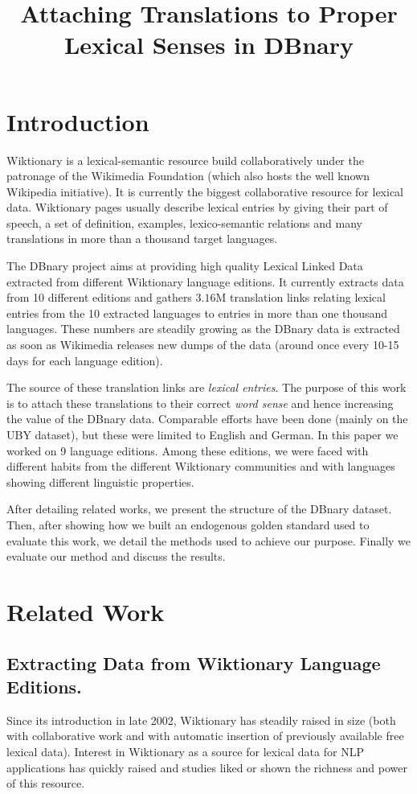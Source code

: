\documentclass[10pt, a4paper]{article}
\title{Attaching Translations to Proper Lexical Senses in DBnary}
\begin{document}
\maketitleabstract

\section{Introduction}

 Wiktionary is a lexical-semantic resource build collaboratively under the patronage of the Wikimedia Foundation (which also hosts the well known Wikipedia initiative). It is currently the biggest collaborative resource for lexical data. Wiktionary pages usually describe lexical entries by giving their part of speech, a set of definition, examples, lexico-semantic relations and many translations in more than a thousand target languages.

The DBnary project \cite{serasset:dbnary-swj} aims at providing high quality Lexical Linked Data extracted from different Wiktionary language editions. It currently extracts data from 10 different editions and gathers $3.16$M translation links relating lexical entries from the 10 extracted languages to entries in more than one thousand languages. These numbers are steadily growing as the DBnary data is extracted as soon as Wikimedia releases new dumps of the data (around once every 10-15 days for each language edition).

The source of these translation links are \emph{lexical entries}. The purpose of this work is to attach these translations to their correct \emph{word sense} and hence increasing the value of the DBnary data. Comparable efforts have been done (mainly on the UBY dataset), but these were limited to English and German. In this paper we worked on 9 language editions. Among these editions, we were faced with different habits from the different Wiktionary communities and with languages showing different linguistic properties. 

After detailing related works, we present the structure of the DBnary dataset. Then, after showing how we built an endogenous golden standard used to evaluate this work, we detail the methods used to achieve our purpose. Finally we evaluate our method and discuss the results.

\section{Related Work}

\subsection{Extracting Data from Wiktionary Language Editions.} Since its introduction in late 2002, Wiktionary has steadily raised in size (both with collaborative work and with automatic insertion of previously available free lexical data). Interest in Wiktionary as a source for lexical data for NLP applications has quickly raised and studies liked \cite{Zesch:AAAI2008} or \cite{navarro-EtAl:2009:PeoplesWeb} shown the richness and power of this resource. 
\end{document}
